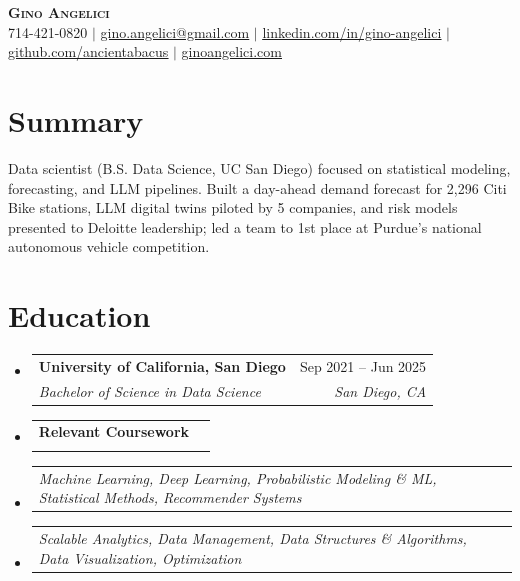 \documentclass[letterpaper,11pt]{article}
\makeatletter
\newcommand{\resumeSubheading}[4]{
  \vspace{-2pt}\item
    \begin{tabular*}{0.97\textwidth}[t]{l@{\extracolsep{\fill}}r}
      \textbf{#1} & #2 \\
      \textit{\small#3} & \textit{\small #4} \\
    \end{tabular*}\vspace{-7pt}
}
\newcommand{\resumeSubSubheading}[2]{
    \item
    \begin{tabular*}{0.97\textwidth}{l@{\extracolsep{\fill}}r}
      \textit{\small#1} & \textit{\small #2} \\
    \end{tabular*}\vspace{-7pt}
}
\newcommand{\resumeSubHeadingListStart}{\begin{itemize}[leftmargin=0.15in, label={}]}
\newcommand{\resumeSubHeadingListEnd}{\end{itemize}}
\makeatother
\begin{document}
\begin{center}
    \textbf{\Huge \scshape Gino Angelici} \\ \vspace{1pt}
    \small 714-421-0820 $|$ \href{mailto:gino.angelici@gmail.com}{\underline{gino.angelici@gmail.com}} $|$
    \href{https://www.linkedin.com/in/gino-angelici/}{\underline{linkedin.com/in/gino-angelici}} $|$
    \href{https://github.com/ancientabacus}{\underline{github.com/ancientabacus}} $|$
    \href{https://ginoangelici.com}{\underline{ginoangelici.com}}
\end{center}

\section{Summary}
\begin{itemize}[leftmargin=0.15in, label={}]
  \small{\item{Data scientist (B.S. Data Science, UC San Diego) focused on statistical modeling, forecasting, and LLM pipelines. Built a day-ahead demand forecast for 2,296 Citi Bike stations, LLM digital twins piloted by 5 companies, and risk models presented to Deloitte leadership; led a team to 1st place at Purdue's national autonomous vehicle competition.}}
\end{itemize}
\vspace{-14pt}

\section{Education}
  \resumeSubHeadingListStart
    \resumeSubheading
      {University of California, San Diego}{Sep 2021 -- Jun 2025}
      {Bachelor of Science in Data Science}{San Diego, CA}
    \resumeSubheading{Relevant Coursework}{}{}{}
    \vspace{-20pt}
    \resumeSubSubheading{Machine Learning, Deep Learning, Probabilistic Modeling \& ML, Statistical Methods, Recommender Systems}{}
    \resumeSubSubheading{Scalable Analytics, Data Management, Data Structures \& Algorithms, Data Visualization, Optimization}{}
  \resumeSubHeadingListEnd

\end{document}

